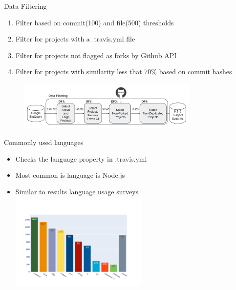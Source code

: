 \documentclass[aspectratio=169,xcolor=dvipsnames]{beamer}
\begin{document}
\begin{frame}{Data Filtering}
    \begin{enumerate}
        \item Filter based on commit(100) and file(500) thresholds
        \item Filter for projects with a .travis.yml file
        \item Filter for projects not flagged as forks by Github API
        \item Filter for projects with similarity less that 70\% based on commit hashes
    \end{enumerate}

    \begin{figure}
        \centering
        \includegraphics[width=0.8\textwidth]{images/data-filtering.png}
        \label{fig:my_label}
    \end{figure}
\end{frame}

\begin{frame}{Commonly used languages}
\begin{itemize}
    \item Checks the language property in .travis.yml
    \item Most common is language is Node.js
    \item Similar to results language usage surveys \\
    
            \centering
            \includegraphics[width=0.535\textwidth]{images/fig21.png}
\end{itemize}

\end{frame}
\end{document}
